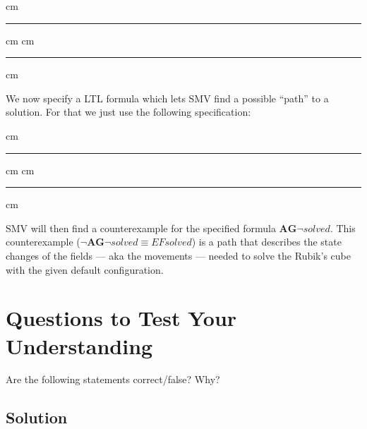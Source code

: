 \documentclass[a4paper, 11pt]{article}
\newcommand{\codeinput}[1]
{
    \vskip 0.3 cm
    {\color{lightgray}\hrule}\vskip 0.3 cm
    {\fontsize{9pt}{11pt}}
    \vskip 0.3 cm{\color{lightgray}\hrule}
    \vskip 0.3 cm
}
\begin{document}
\codeinput{cube_define}

We now specify a LTL formula which lets SMV find a possible “path” to a solution. For that we just use the following specification:

\codeinput{cube_spec}

SMV will then find a counterexample for the specified formula $\mathbf{AG} ¬solved $. This counterexample ($¬\mathbf{AG} ¬solved ≡ EF solved$) is a path that describes the state changes of the fields — aka the movements — needed to solve the Rubik's cube with the given default configuration.

\newpage
\section{Questions to Test Your Understanding}

Are the following statements correct/false? Why?

\subsection{Solution}
\end{document}
